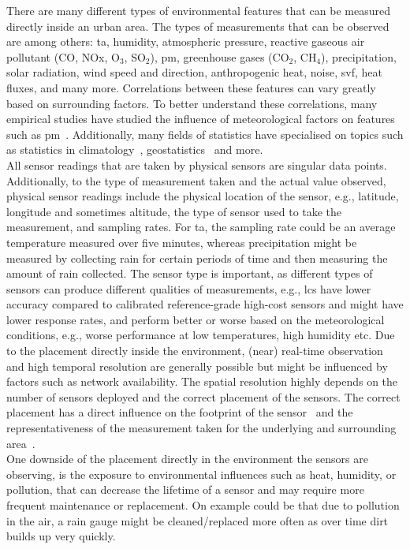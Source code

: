 There are many different types of environmental features that can be measured directly inside an urban area. The types of measurements that can be observed are among others: \gls{ta}, humidity, atmospheric pressure, reactive gaseous air pollutant (CO, NOx, O$_3$, SO$_2$), \gls{pm}, greenhouse gases (CO$_2$, CH$_4$), precipitation, solar radiation, wind speed and direction, anthropogenic heat, noise, \gls{svf}, heat fluxes, and many more.
Correlations between these features can vary greatly based on surrounding factors. To better understand these correlations, many empirical studies have studied the influence of meteorological factors on features such as \gls{pm}~\cite{tai2010correlations}. Additionally, many fields of statistics have specialised on topics such as statistics in climatology~\cite{von2002statistical}, geostatistics~\cite{trangmar1986application} and more.\\
All sensor readings that are taken by physical sensors are singular data points. Additionally, to the type of measurement taken and the actual value observed, physical sensor readings include the physical location of the sensor, e.g., latitude, longitude and sometimes altitude, the type of sensor used to take the measurement, and sampling rates. For \gls{ta}, the sampling rate could be an average temperature measured over five minutes, whereas precipitation might be measured by collecting rain for certain periods of time and then measuring the amount of rain collected. The sensor type is important, as different types of sensors can produce different qualities of measurements, e.g., \gls{lcs} have lower accuracy compared to calibrated reference-grade high-cost sensors and might have lower response rates, and perform better or worse based on the meteorological conditions, e.g., worse performance at low temperatures, high humidity etc. Due to the placement directly inside the environment, (near) real-time observation and high temporal resolution are generally possible but might be influenced by factors such as network availability. The spatial resolution highly depends on the number of sensors deployed and the correct placement of the sensors. The correct placement has a direct influence on the footprint of the sensor~\cite{leclerc2014footprints} and the representativeness of the measurement taken for the underlying and surrounding area~\cite{oke2006guideline}.\\
One downside of the placement directly in the environment the sensors are observing, is the exposure to environmental influences such as heat, humidity, or pollution, that can decrease the lifetime of a sensor and may require more frequent maintenance or replacement. On example could be that due to pollution in the air, a rain gauge might be cleaned/replaced more often as over time dirt builds up very quickly.

